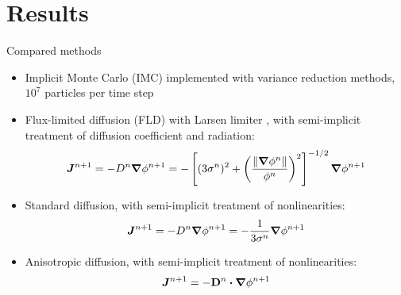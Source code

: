\documentclass{beamer}
\begin{document}
\section{Results}
\begin{frame}{Compared methods}
\begin{itemize}
  \item Implicit Monte Carlo (IMC) \cite{Fle1971} implemented with variance
    reduction methods, $10^7$ particles per time step
  \item {Fl}ux-limited diffusion (FLD) with Larsen limiter \cite{Ols2000}, with
    semi-implicit treatment of diffusion coefficient and radiation:
    \begin{equation*}
      \bm{J}^{n+1} = - D^{n} \bm{\nabla} \phi^{n+1}  = -\left[ (3\sigma^{n})^2
      + \left( \frac{\left\| \bm{\nabla} \phi^{n} \right\|}{\phi^{n}}  \right)^2 \right]^{-1/2}
      \bm{\nabla} \phi^{n+1}
    \end{equation*}
  \item Standard diffusion, with semi-implicit treatment of nonlinearities:
    \begin{equation*}
      \bm{J}^{n+1} = - D^{n} \bm{\nabla} \phi^{n+1} 
      = -\frac{1}{3\sigma^{n}} \bm{\nabla} \phi^{n+1}
    \end{equation*}
  \item Anisotropic diffusion, with semi-implicit treatment of nonlinearities:
    \begin{equation*}
      \bm{J}^{n+1} = -\mathbf{D}^{n}\bm{\cdot} \bm{\nabla} \phi^{n+1} 
    \end{equation*}
\end{itemize}
\end{frame}
\end{document}
